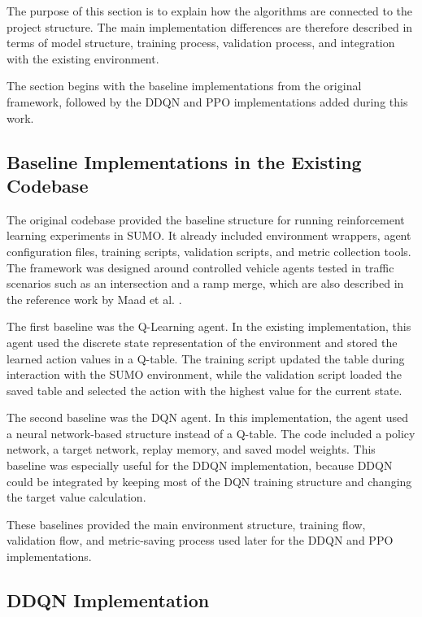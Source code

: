 \documentclass{article}
\begin{document}
The purpose of this section is to explain how the algorithms are connected to the project structure. The main implementation differences are therefore described in terms of model structure, training process, validation process, and integration with the existing environment.

The section begins with the baseline implementations from the original framework, followed by the DDQN and PPO implementations added during this work.

\subsection{Baseline Implementations in the Existing Codebase}

The original codebase provided the baseline structure for running reinforcement learning experiments in SUMO. It already included environment wrappers, agent configuration files, training scripts, validation scripts, and metric collection tools. The framework was designed around controlled vehicle agents tested in traffic scenarios such as an intersection and a ramp merge, which are also described in the reference work by Maad et al. \cite{maad2025dynamic}.

The first baseline was the Q-Learning agent. In the existing implementation, this agent used the discrete state representation of the environment and stored the learned action values in a Q-table. The training script updated the table during interaction with the SUMO environment, while the validation script loaded the saved table and selected the action with the highest value for the current state.

The second baseline was the DQN agent. In this implementation, the agent used a neural network-based structure instead of a Q-table. The code included a policy network, a target network, replay memory, and saved model weights. This baseline was especially useful for the DDQN implementation, because DDQN could be integrated by keeping most of the DQN training structure and changing the target value calculation.

These baselines provided the main environment structure, training flow, validation flow, and metric-saving process used later for the DDQN and PPO implementations.


\subsection{DDQN Implementation}
\end{document}
